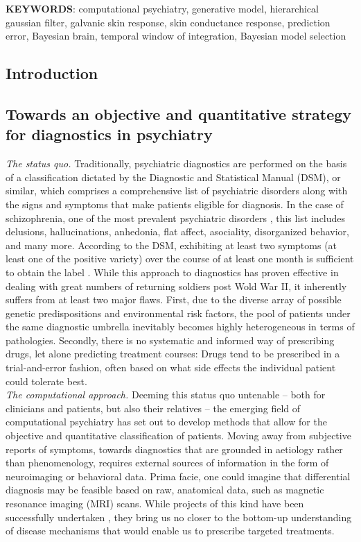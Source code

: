 \documentclass{article}
\begin{document}
\textsf{\textbf{KEYWORDS}: computational psychiatry, generative model, hierarchical gaussian filter, galvanic skin response, skin conductance response, prediction error, Bayesian brain, temporal window of integration, Bayesian model selection}
\begin{multicols}{2}
\section*{Introduction}
\label{sec:intro}
\subsection*{Towards an objective and quantitative strategy for diagnostics in psychiatry}	
\textit{The status quo.} Traditionally, psychiatric diagnostics are performed on the basis of a classification dictated by the Diagnostic and Statistical Manual (DSM), or similar, which comprises a comprehensive list of psychiatric disorders along with the signs and symptoms that make patients eligible for diagnosis. In the case of schizophrenia, one of the most prevalent psychiatric disorders \citep{Saha2005}, this list includes delusions, hallucinations, anhedonia, flat affect, asociality, disorganized behavior, and many more. According to the DSM, exhibiting at least two symptoms (at least one of the positive variety) over the course of at least one month is sufficient to obtain the label . While this approach to diagnostics has proven effective in dealing with great numbers of returning soldiers post Wold War II, it inherently suffers from at least two major flaws. First, due to the diverse array of possible genetic predispositions and environmental risk factors, the pool of patients under the same diagnostic umbrella inevitably becomes highly heterogeneous in terms of pathologies. Secondly, there is no systematic and informed way of prescribing drugs, let alone predicting treatment courses: Drugs tend to be prescribed in a trial-and-error fashion, often based on what side effects the individual patient could tolerate best. \\ 
\textit{The computational approach.} Deeming this status quo untenable -- both for clinicians and patients, but also their relatives -- the emerging field of computational psychiatry has set out to develop methods that allow for the objective and quantitative classification of patients. Moving away from subjective reports of symptoms, towards diagnostics that are grounded in aetiology rather than phenomenology, requires external sources of information in the form of neuroimaging or behavioral data. Prima facie, one could imagine that differential diagnosis may be feasible based on raw, anatomical data, such as magnetic resonance imaging (MRI) scans. While projects of this kind have been successfully undertaken \citep{Liu2017}, they bring us no closer to the bottom-up understanding of disease mechanisms that would enable us to prescribe targeted treatments. \\

\end{multicols}
\end{document}

